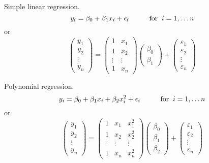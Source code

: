 \bexa
Simple linear regression.
$$
y_i = \beta_0 + \beta_1 x_i + \epsilon_i  \hskip1cm {\mbox{for}} \; \;  i = 1,\ldots n
$$
or
$$
\left( \begin{array}{c} y_1 \\ y_2 \\ \vdots \\ y_n \end{array} \right) =
\left( \begin{array}{cc}
1 & x_1 \\ 
1 & x_2 \\ 
\vdots & \vdots \\ 
1 & x_n
\end{array} \right)
\left( \begin{array}{c} \beta_0 \\ \beta_1 \end{array} \right) +
\left( \begin{array}{c} \varepsilon_1 \\ \varepsilon_2 \\ \vdots \\ 
	\varepsilon_n \end{array} \right) 
$$
\esexa

\bexa
Polynomial regression.
$$
y_i = \beta_0 + \beta_1 x_i + \beta_2 x_i^2 + \epsilon_i  \hskip1cm {\mbox{for}} \; \;  i = 1,\ldots n
$$
or
$$
\left( \begin{array}{c} y_1 \\ y_2 \\ \vdots \\ y_n \end{array} \right) =
\left( \begin{array}{ccc}
1 & x_1 & x_1^2\\ 
1 & x_2 & x_2^2\\ 
\vdots & \vdots & \vdots\\ 
1 & x_n & x_n^2
\end{array} \right)
\left( \begin{array}{c} \beta_0 \\ \beta_1 \\ \beta_2 \end{array} \right) +
\left( \begin{array}{c} \varepsilon_1 \\ \varepsilon_2 \\ \vdots \\ 
	\varepsilon_n \end{array} \right) 
$$
\esexa

